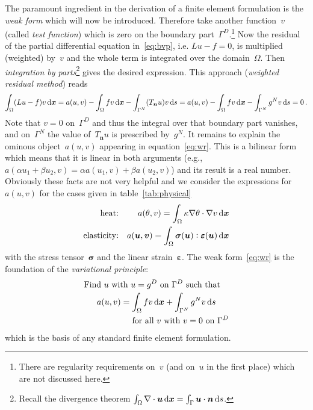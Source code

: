 \documentclass[a4paper,DIV=12,10pt]{scrartcl}
\newcommand{\vek}[1]{\boldsymbol{#1}}  %
\newcommand{\col}[0]{\vcentcolon}
\newcommand{\x}[0]{\vek{x}}
\newcommand{\U}[0]{\vek{u}}
\newcommand{\V}[0]{\vek{v}}
\newcommand{\N}[0]{\vek{n}}
\begin{document}
The paramount ingredient in the derivation of a finite element
formulation is the \emph{weak form} which will now be
introduced. Therefore take another function~$v$ (called \emph{test
  function}) which is zero on the boundary
part~$\Gamma^D$.\footnote{There are regularity requirements on~$v$
  (and on~$u$ in the first place) which are not discussed here.}  Now
the residual of the partial differential equation in~\eqref{eq:bvp},
i.e. \mbox{$L u - f = 0$}, is multiplied (weighted) by~$v$ and the
whole term is integrated over the domain~$\Omega$. Then
\emph{integration by parts}\footnote{Recall the divergence theorem
  $\int_\Omega \nabla \cdot \U \dif \x = \int_\Gamma \U \cdot \N \dif
  s$.} gives the desired expression. This approach (\emph{weighted
  residual method}) reads
\begin{equation}
  \label{eq:wr}
  \int_\Omega (L u -f) v \dif \x = 
  a(u,v) - \int_\Omega f v \dif \x -\int_{\Gamma^N} (T_{\N} u) v \dif s = 
  a(u,v) - \int_\Omega f v \dif \x - \int_{\Gamma^N} g^N v \dif s = 0\,.
\end{equation}
Note that $v=0$ on~$\Gamma^D$ and thus the integral over that
boundary part vanishes, and on~$\Gamma^N$ the value of~$T_{\N} u$ is
prescribed by~$g^N$. It remains to explain the ominous object~$a(u,v)$
appearing in equation~\eqref{eq:wr}. This is a bilinear form which
means that it is linear in both arguments (e.g., $a(\alpha u_1 + \beta
u_2, v) = \alpha a(u_1,v) + \beta a(u_2,v)$) and its result is a real
number. Obviously these facts are not very helpful and we consider the
expressions for~$a(u,v)$ for the cases given in
table~\ref{tab:physical}
\begin{align*}
  \text{heat:} 
  &&a(\theta,v) = \int_\Omega \kappa \nabla \theta \cdot \nabla v  \dif \x \\
  \text{elasticity:} 
  &&a(\U,\V) =\int_\Omega \vek{\sigma}(\U) \col \vek{\varepsilon}(\U)
  \dif \x
\end{align*}
with the stress tensor~$\vek{\sigma}$ and the linear strain~$\vek{\varepsilon}$.
The weak form~\eqref{eq:wr} is the foundation of the \emph{variational
  principle}:
\begin{equation}  \label{eq:vp}
  \begin{multlined}[c][.8\displaywidth]
    \text{Find $u$ with $u=g^D$ on $\Gamma^D$ such that} \\
    a(u,v) = \int_\Omega f v \dif \x + \int_{\Gamma^N} g^N v \dif s \\
    \text{for all $v$ with $v = 0$ on $\Gamma^D$}
  \end{multlined}
\end{equation}
which is the basis of any standard finite element formulation.
\end{document}
